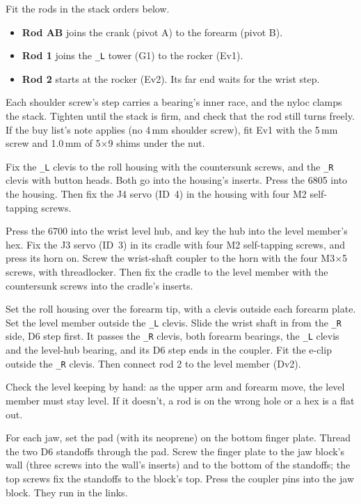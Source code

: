 \documentclass[10pt]{article}
\begin{document}
Fit the rods in the stack orders below.
\begin{itemize}\itemsep0pt
  \item \textbf{Rod AB} joins the crank (pivot A) to the forearm (pivot B).
  \item \textbf{Rod 1} joins the \texttt{\_L} tower (G1) to the rocker (Ev1).
  \item \textbf{Rod 2} starts at the rocker (Ev2). Its far end waits for the wrist step.
\end{itemize}
Each shoulder screw's step carries a bearing's inner race, and the nyloc clamps the stack. Tighten until the stack is
firm, and check that the rod still turns freely. If the buy list's note applies (no 4\,mm shoulder screw), fit Ev1 with
the 5\,mm screw and 1.0\,mm of 5$\times$9 shims under the nut.
\steplater

Fix the \texttt{\_L} clevis to the roll housing with the countersunk screws, and the \texttt{\_R} clevis with button
heads. Both go into the housing's inserts. Press the 6805 into the housing. Then fix the J4 servo (ID~4) in the housing
with four M2 self-tapping screws.
\steplater

Press the 6700 into the wrist level hub, and key the hub into the level member's hex. Fix the J3 servo (ID~3) in its
cradle with four M2 self-tapping screws, and press its horn on. Screw the wrist-shaft coupler to the horn with the four
M3$\times$5 screws, with threadlocker. Then fix the cradle to the level member with the countersunk screws into the
cradle's inserts.
\steplater

Set the roll housing over the forearm tip, with a clevis outside each forearm plate. Set the level member outside the
\texttt{\_L} clevis. Slide the wrist shaft in from the \texttt{\_R} side, D6 step first. It passes the \texttt{\_R}
clevis, both forearm bearings, the \texttt{\_L} clevis and the level-hub bearing, and its D6 step ends in the coupler.
Fit the e-clip outside the \texttt{\_R} clevis. Then connect rod 2 to the level member (Dv2).

Check the level keeping by hand: as the upper arm and forearm move, the level member must stay level. If it doesn't,
a rod is on the wrong hole or a hex is a flat out.
\steplater

For each jaw, set the pad (with its neoprene) on the bottom finger plate. Thread the two D6 standoffs through the
pad. Screw the finger plate to the jaw block's wall (three screws into the wall's inserts) and to the bottom of the
standoffs; the top screws fix the standoffs to the block's top. Press the coupler pins
into the jaw block. They run in the links.
\steplater
\end{document}
